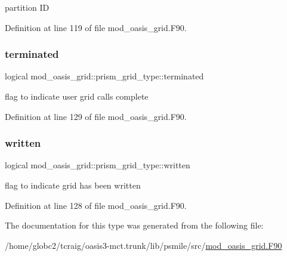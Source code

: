 partition ID 



Definition at line 119 of file mod\+\_\+oasis\+\_\+grid.\+F90.

\mbox{\label{structmod__oasis__grid_1_1prism__grid__type_a2dcbbc51a20f881a1d06609688d72734}} 
\subsubsection{\texorpdfstring{terminated}{terminated}}
{\footnotesize\ttfamily logical mod\+\_\+oasis\+\_\+grid\+::prism\+\_\+grid\+\_\+type\+::terminated\hspace{0.3cm}{\ttfamily [private]}}



flag to indicate user grid calls complete 



Definition at line 129 of file mod\+\_\+oasis\+\_\+grid.\+F90.

\mbox{\label{structmod__oasis__grid_1_1prism__grid__type_a48d243ede1b306ac35bb9bbeff48785a}} 
\subsubsection{\texorpdfstring{written}{written}}
{\footnotesize\ttfamily logical mod\+\_\+oasis\+\_\+grid\+::prism\+\_\+grid\+\_\+type\+::written\hspace{0.3cm}{\ttfamily [private]}}



flag to indicate grid has been written 



Definition at line 128 of file mod\+\_\+oasis\+\_\+grid.\+F90.



The documentation for this type was generated from the following file\+:\begin{DoxyCompactItemize}
\item 
/home/globc2/tcraig/oasis3-\/mct.\+trunk/lib/psmile/src/\hyperlink{mod__oasis__grid_8_f90}{mod\+\_\+oasis\+\_\+grid.\+F90}\end{DoxyCompactItemize}
